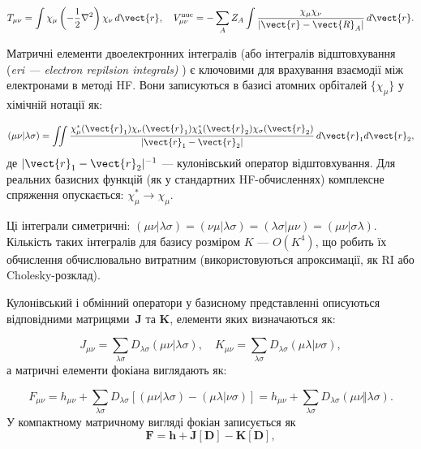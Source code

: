 \begin{equation*}
	T_{\mu\nu} = \int \chi_\mu \left(-\frac{1}{2}\nabla^2\right) \chi_\nu \, d\vect{r}, \quad V_{\mu\nu}^{\text{nuc}} = -\sum_A Z_A \int \frac{\chi_\mu \chi_\nu}{|\vect{r} - \vect{R}_A|} \, d\vect{r}.
\end{equation*}

Матричні елементи двоелектронних інтегралів (або інтегралів відштовхування (\emph{eri --- electron repilsion integrals)} ) є ключовими для врахування взаємодії між електронами в методі HF. Вони записуються в базисі атомних орбіталей $\{\chi_\mu\}$ у хімічній нотації як:

\begin{equation}
	(\mu \nu | \lambda \sigma) = \iint \frac{\chi_\mu^*(\vect{r}_1) \chi_\nu(\vect{r}_1) \chi_\lambda^*(\vect{r}_2) \chi_\sigma(\vect{r}_2)}{|\vect{r}_1 - \vect{r}_2|} \, d\vect{r}_1 d\vect{r}_2,
\end{equation}
%
де $|\vect{r}_1 - \vect{r}_2|^{-1}$ --- кулонівський оператор відштовхування. Для реальних базисних функцій (як у стандартних HF-обчисленнях) комплексне спряження опускається: $\chi_\mu^* \to \chi_\mu$.

Ці інтеграли симетричні: $(\mu \nu | \lambda \sigma) = (\nu \mu | \lambda \sigma) = (\lambda \sigma | \mu \nu) = (\mu \nu | \sigma \lambda)$. Кількість таких інтегралів для базису розміром $K$ --- $O(K^4)$, що робить їх обчислення обчислювально витратним (використовуються апроксимації, як RI або Cholesky-розклад).

Кулонівський і обмінний оператори у базисному представленні описуються відповідними матрицями~$\mathbf{J}$ та $\mathbf{K}$, елементи яких визначаються як:

\begin{equation}\label{eq:JK_basis_form}
	J_{\mu\nu} = \sum_{\lambda\sigma} D_{\lambda\sigma} (\mu \nu | \lambda \sigma), \quad K_{\mu\nu} = \sum_{\lambda\sigma} D_{\lambda\sigma} (\mu \lambda | \nu \sigma),
\end{equation}
а матричні елементи фокіана виглядають як:

\begin{equation}\label{eq:F_basis_form}
	F_{\mu\nu} = h_{\mu\nu} + \sum_{\lambda\sigma} D_{\lambda\sigma}
	\left[ (\mu\nu|\lambda\sigma) - (\mu\lambda|\nu\sigma) \right] =  h_{\mu\nu} + \sum_{\lambda\sigma} D_{\lambda\sigma} (\mu\nu\Vert\lambda\sigma).
\end{equation}
У компактному матричному вигляді фокіан записується як
\begin{equation}\label{eq:F_matrix}
	\mathbf F = \mathbf h + \mathbf J[\mathbf D] - \mathbf K[\mathbf D],
\end{equation}

